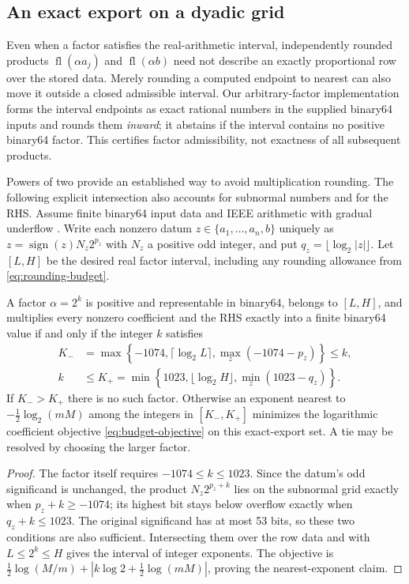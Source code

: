 \subsection{An exact export on a dyadic grid}
Even when a factor satisfies the real-arithmetic interval, independently rounded
products $\operatorname{fl}(\alpha a_j)$ and $\operatorname{fl}(\alpha b)$ need not
describe an exactly proportional row over the stored data. Merely rounding a
computed endpoint to nearest can also move it outside a closed admissible interval.
Our arbitrary-factor implementation forms the interval endpoints as exact rational
numbers in the supplied binary64 inputs and rounds them \emph{inward}; it abstains
if the interval contains no positive binary64 factor. This certifies factor
admissibility, not exactness of all subsequent products.

Powers of two provide an established way to avoid multiplication rounding. The
following explicit intersection also accounts for subnormal numbers and for the
RHS. Assume finite binary64 input data and IEEE arithmetic with gradual underflow
\cite{ieee2019float}. Write each nonzero
datum $z\in\{a_1,\ldots,a_n,b\}$ uniquely as
$z=\operatorname{sign}(z)N_z2^{p_z}$ with $N_z$ a positive odd integer, and put
$q_z=\lfloor\log_2|z|\rfloor$. Let $[L,H]$ be the desired real factor interval,
including any rounding allowance from \eqref{eq:rounding-budget}.

\begin{proposition}
\label{prop:dyadic}
A factor $\alpha=2^k$ is positive and representable in binary64, belongs to
$[L,H]$, and multiplies every nonzero coefficient and the RHS exactly into a
finite binary64 value if and only if the integer $k$ satisfies
\begin{align*}
 K_-&=\max\left\{-1074,\lceil\log_2L\rceil,
                    \max_z(-1074-p_z)\right\}\le k,\\
 k&\le K_+=\min\left\{1023,\lfloor\log_2H\rfloor,
                    \min_z(1023-q_z)\right\}.
\end{align*}
If $K_->K_+$ there is no such factor. Otherwise an exponent nearest to
$-\tfrac12\log_2(mM)$ among the integers in $[K_-,K_+]$ minimizes the
logarithmic coefficient objective \eqref{eq:budget-objective} on this exact-export
set. A tie may be resolved by choosing the larger factor.
\end{proposition}
\begin{proof}
The factor itself requires $-1074\le k\le1023$. Since the datum's odd
significand is unchanged, the product $N_z2^{p_z+k}$ lies on the subnormal grid
exactly when $p_z+k\ge-1074$; its highest bit stays below overflow exactly when
$q_z+k\le1023$. The original significand has at most 53 bits, so these two
conditions are also sufficient. Intersecting them over the row data and with
$L\le2^k\le H$ gives the interval of integer exponents. The objective is
$\tfrac12\log(M/m)+|k\log2+\tfrac12\log(mM)|$, proving the nearest-exponent
claim.
\end{proof}

